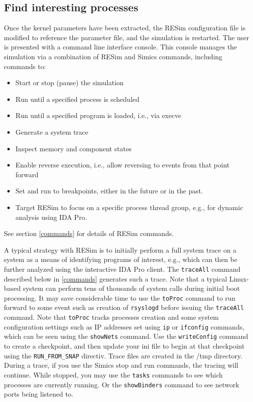 \documentclass[titlepage]{article}
\begin{document}
\subsection{Find interesting processes}
Once the kernel parameters have been extracted, the RESim configuration file is modified to reference the parameter file, and the simulation is restarted. The user is
presented with a command line interface console.  This console manages the simulation via a combination of RESim and Simics commands, including commands to:
\begin{itemize}
\item Start or stop (pause) the simulation
\item Run until a specified process is scheduled
\item Run until a specified program is loaded, i.e., via execve
\item Generate a system trace
\item Inspect memory and component states
\item Enable reverse execution, i.e., allow reversing to events from that point forward
\item Set and run to breakpoints, either in the future or in the past.
\item Target RESim to focus on a specific process thread group, e.g., for dynamic analysis using IDA Pro.
\end{itemize}
\noindent See section \ref{commands} for details of RESim commands.

A typical strategy with RESim is to initially perform a full system trace on a system as a means of identifying programs of interest, e.g., which can then be
further analyzed using the interactive IDA Pro client.  The {\tt traceAll} command described below in \ref{commands} generates such a trace.  Note that a typical Linux-based
system can perform tens of thousands of system calls during initial boot processing.  It may save considerable time to use the {\tt toProc} command to run forward to some
event such as creation of {\tt rsyslogd} before issuing the {\tt traceAll} command.  Note that {\tt toProc} tracks processes creation and some system configuration settings such as
IP addresses set using {\tt ip} or {\tt ifconfig} commands, which can be seen using the {\tt showNets} command.  Use the {\tt writeConfig} command to create a checkpoint,
and then update your ini file to begin at that checkpoint using the {\tt RUN\_FROM\_SNAP} directiv.  Trace files are created in the /tmp directory.  During a trace, if you use the Simics stop and
run commands, the tracing will continue.  While stopped, you may use the {\tt tasks} commands to see which processes are currently running.  Or the {\tt showBinders} command to 
see network ports being listened to. 
\end{document}
